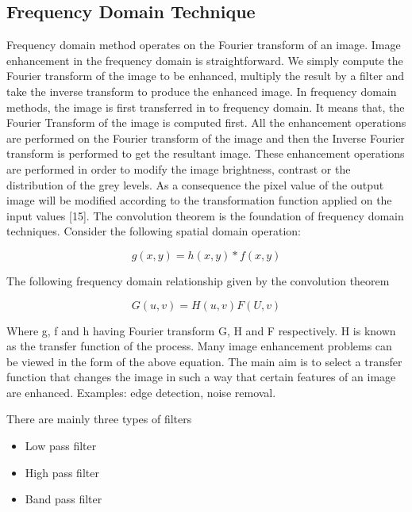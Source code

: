 \subsection{Frequency Domain Technique}
Frequency domain method operates on the Fourier transform of an image. Image enhancement in the frequency domain is straightforward. We simply compute the Fourier transform of the image to be enhanced, multiply the result by a filter and take the inverse transform to produce the enhanced image. In frequency domain methods, the image is first transferred in to frequency domain\cite{ie1}. It means that, the Fourier Transform of the image is computed first. All the enhancement operations are performed on the Fourier transform of the image and then the Inverse Fourier transform is performed to get the resultant image\cite{lime3}. These enhancement operations are performed in order to modify the image brightness, contrast or the distribution of the grey levels. As a consequence the pixel value of the output image will be modified according to the transformation function applied on the input values [15]. The convolution theorem is the foundation of frequency domain techniques\cite{ie2}. Consider the following spatial domain operation:

\begin{equation}
	g(x,y)=h(x,y)*f(x,y)
\end{equation}

The following frequency domain relationship given by the convolution theorem 

\begin{equation}
	G (u, v) = H (u, v) F (U, v)
\end{equation}


Where g, f and h having Fourier transform G, H and F respectively. H is known as the transfer function of the process. Many image enhancement problems can be viewed in the form of the above equation. The main aim is to select a transfer function that changes the image in such a way that certain features of an image are enhanced\cite{ie1}. Examples: edge detection, noise removal.

There are mainly three types of filters
\begin{itemize}
	\item Low pass filter
	\item High pass filter
	\item Band pass filter

\end{itemize}

